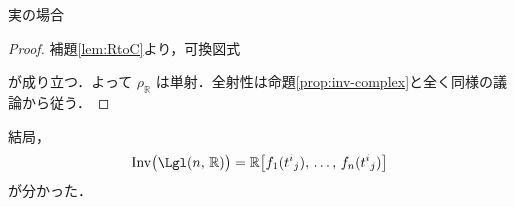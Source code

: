 \documentclass[TQFT_main]{subfiles}
\begin{document}
\begin{myexample}[label=case:real]{実の場合}
    \begin{proof}
        補題\ref{lem:RtoC}より，可換図式
        \begin{center}
        \end{center}
        が成り立つ．よって $\rho_{\mathbb{R}}$ は単射．全射性は命題\ref{prop:inv-complex}と全く同様の議論から従う．
    \end{proof}
    結局，
    \begin{align}
        \mathrm{Inv} \bigl( \Lgl(n,\, \mathbb{R}) \bigr) = \mathbb{R} \bigl[ f_1(t^i{}_j),\, \dots,\, f_n(t^i{}_j) \bigr] 
    \end{align}
    が分かった．
\end{myexample}
\end{document}
